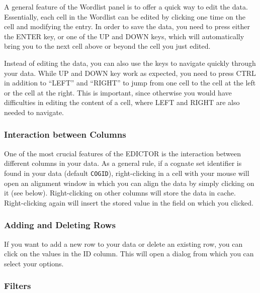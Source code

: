 \documentclass[a4paper,svgnames]{scrartcl}
\begin{document}
A general feature of the Wordlist panel is to offer a quick way to edit
the data. Essentially, each cell in the Wordlist can be edited by
clicking one time on the cell and modifying the entry. In order to save
the data, you need to press either the ENTER key, or one of the UP and
DOWN keys, which will automatically bring you to the next cell above or
beyond the cell you just edited.

Instead of editing the data, you can also use the keys to navigate
quickly through your data. While UP and DOWN key work as expected, you
need to press CTRL in addition to ``LEFT'' and ``RIGHT'' to jump from
one cell to the cell at the left or the cell at the right. This is
important, since otherwise you would have difficulties in editing the
content of a cell, where LEFT and RIGHT are also needed to navigate.

\subsubsection*{Interaction between
Columns}\label{interaction-between-columns}

One of the most crucial features of the EDICTOR is the interaction
between different columns in your data. As a general rule, if a cognate
set identifier is found in your data (default \texttt{COGID}),
right-clicking in a cell with your mouse will open an alignment window
in which you can align the data by simply clicking on it (see below).
Right-clicking on other columns will store the data in cache.
Right-clicking again will insert the stored value in the field on which
you clicked.

\subsubsection*{Adding and Deleting
Rows}\label{adding-and-deleting-rows}

If you want to add a new row to your data or delete an existing row, you
can click on the values in the ID column. This will open a dialog from
which you can select your options.

\subsubsection*{Filters}\label{filters}
\end{document}

